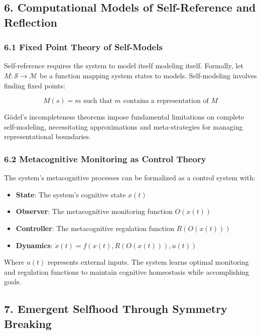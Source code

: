 \documentclass[
]{article}
\providecommand{\tightlist}{%
  \setlength{\itemsep}{0pt}\setlength{\parskip}{0pt}}
\begin{document}
\subsection{6. Computational Models of Self-Reference and
Reflection}\label{computational-models-of-self-reference-and-reflection}

\subsubsection{6.1 Fixed Point Theory of
Self-Models}\label{fixed-point-theory-of-self-models}

Self-reference requires the system to model itself modeling itself.
Formally, let \(M: \mathcal{S} \rightarrow \mathcal{M}\) be a function
mapping system states to models. Self-modeling involves finding fixed
points:

\[M(s) = m \text{ such that } m \text{ contains a representation of } M\]

Gödel's incompleteness theorems impose fundamental limitations on
complete self-modeling, necessitating approximations and meta-strategies
for managing representational boundaries.

\subsubsection{6.2 Metacognitive Monitoring as Control
Theory}\label{metacognitive-monitoring-as-control-theory}

The system's metacognitive processes can be formalized as a control
system with:

\begin{itemize}
\tightlist
\item
  \textbf{State}: The system's cognitive state \(x(t)\)
\item
  \textbf{Observer}: The metacognitive monitoring function \(O(x(t))\)
\item
  \textbf{Controller}: The metacognitive regulation function
  \(R(O(x(t)))\)
\item
  \textbf{Dynamics}: \(\dot{x}(t) = f(x(t), R(O(x(t))), u(t))\)
\end{itemize}

Where \(u(t)\) represents external inputs. The system learns optimal
monitoring and regulation functions to maintain cognitive homeostasis
while accomplishing goals.

\subsection{7. Emergent Selfhood Through Symmetry
Breaking}\label{emergent-selfhood-through-symmetry-breaking}
\end{document}
